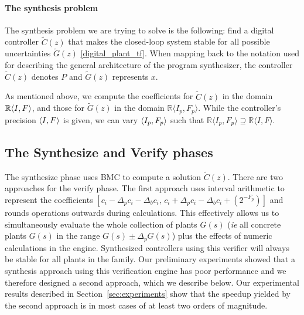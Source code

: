 \documentclass[final]{sig-alternate-05-2015}
\newcommand{\red}[1]{{\color{red}#1}}
\begin{document}

\paragraph{The synthesis problem}
The synthesis problem we are trying to solve is the following:
find a digital controller $\tilde C(z)$ %
that makes the closed-loop system stable 
for all possible uncertainties 
$\tilde G(z)$ \eqref{digital_plant_tf}.
When mapping back to the notation used for describing the general architecture 
of the program synthesizer, the controller $\tilde C(z)$ denotes $P$ and 
$\tilde G(z)$ represents $x$. 

As mentioned above, we compute the coefficients for $\tilde C(z)$ 
in the domain $\mathbb{R}\langle{I},{F}\rangle$, 
and those for $\tilde G(z)$ in the domain
$\mathbb{R}\langle I_p,F_p \rangle$.
While the controller's precision $\langle{I},{F}\rangle$ is given, 
we can vary $\langle{I_p},{F_p}\rangle$ such that 
$\mathbb{R}\langle I_p,F_p \rangle \supseteq \mathbb{R}\langle I,F \rangle$.

\subsection{The {\sc Synthesize} and {\sc Verify} phases}

The {\sc synthesize} phase uses BMC to 
compute a solution $\tilde C(z)$.
There are two approaches for the {\sc verify} phase.
The first approach uses interval arithmetic \cite{moore1966interval}
to represent the coefficients
$[{c}_i-\Delta_p{c}_i-\Delta_b{c}_i,\,\allowbreak
{c}_i+\Delta_p{c}_i-\Delta_b{c}_i+(2^{-F_p})]$ 
and rounds operations outwards during calculations.  This effectively allows
us to simultaneously evaluate the whole collection of plants $\hat{G}(s)$ (\emph{ie} all concrete plants $G(s)$ in the range $G(s) \pm \Delta_pG(s)$)
plus the effects of numeric calculations in the engine.  Synthesized
controllers using this verifier will always be stable for all plants in the
family.
Our preliminary experiments showed that a synthesis approach
using this verification engine has poor performance and we
therefore designed a second approach, which we describe below.
Our experimental results described in Section~\ref{sec:experiments}
show that the speedup yielded by the second approach 
is in most cases of at least two orders of magnitude. 
\end{document}

